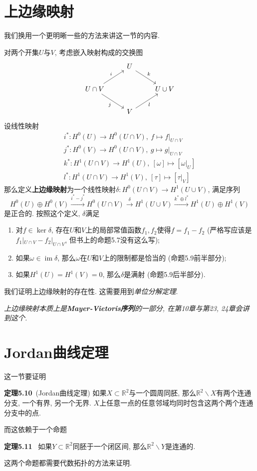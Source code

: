 \documentclass[11pt]{article}
\theoremstyle{definition}\newtheorem*{analyse}{分析}
\newenvironment{env}[1]{\par\vspace{1em}\noindent\textbf{#1}\ }{\par\vspace{1em}}
\DeclareMathOperator{\im}{im}
\begin{document}
\section{上边缘映射}
我们换用一个更明晰一些的方法来讲这一节的内容.

对两个开集$U$与$V$, 考虑嵌入映射构成的交换图
\[\begin{tikzcd}
    & U \arrow[dr, "k"] & \\
    U\cap V \arrow[ur, "i"] \arrow[dr, "j"'] & & U\cup V\\
    & V \arrow[ur, "l"'] &
\end{tikzcd}\]
设线性映射
\begin{gather*}
    i^*:H^0(U)\to H^0(U\cap V),\ f\mapsto f|_{U\cap V}\\
    j^*:H^0(V)\to H^0(U\cap V),\ g\mapsto g|_{U\cap V}\\
    k^*:H^1(U\cap V)\to H^1(U),\ [\omega]\mapsto[\omega|_U]\\
    l^*:H^1(U\cap V)\to H^1(V),\ [\tau]\mapsto[\tau|_V]
\end{gather*}
那么定义\textbf{上边缘映射}为一个线性映射$\delta:H^0(U\cap V)\to H^1(U\cup V)$, 满足序列
\[H^0(U)\oplus H^0(V)\xrightarrow{i^*-j^*}H^0(U\cap V)\xrightarrow{\delta}H^1(U\cup V)\xrightarrow{k^*\oplus l^*}H^1(U)\oplus H^1(V)\]
是正合的.
按照这个定义, $\delta$满足
\begin{enumerate}
    \item 对$f\in\ker\delta$, 存在$U$和$V$上的局部常值函数$f_1,f_2$使得$f=f_1-f_2$ (严格写应该是$f_1|_{U\cap V}-f_2|_{U\cap V}$, 但书上的命题5.7没有这么写);
    \item 如果$\omega\in\im\delta$, 那么$\omega$在$U$和$V$上的限制都是恰当的 (命题5.9前半部分);
    \item 如果$H^1(U)=H^1(V)=0$, 那么$\delta$是满射 (命题5.9后半部分).
\end{enumerate}

我们证明上边缘映射的存在性.
这需要用到\textit{单位分解定理}.

{\it 上边缘映射本质上是\textbf{Mayer-Vietoris序列}的一部分, 在第10章与第23, 24章会讲到这个.}

\section{Jordan曲线定理}
这一节要证明
\begin{env}{定理5.10}(Jordan曲线定理)
    如果$X\subset\mathbb{R}^2$与一个圆周同胚, 那么$\mathbb{R}^2\backslash X$有两个连通分支, 一个有界, 另一个无界.
    $X$上任意一点的任意邻域均同时包含这两个两个连通分支中的点.
\end{env}
\noindent 而这依赖于一个命题
\begin{env}{定理5.11}
    如果$Y\subset\mathbb{R}^2$同胚于一个闭区间, 那么$\mathbb{R}^2\backslash Y$是连通的.
\end{env}
\noindent 这两个命题都需要代数拓扑的方法来证明.
\end{document}

